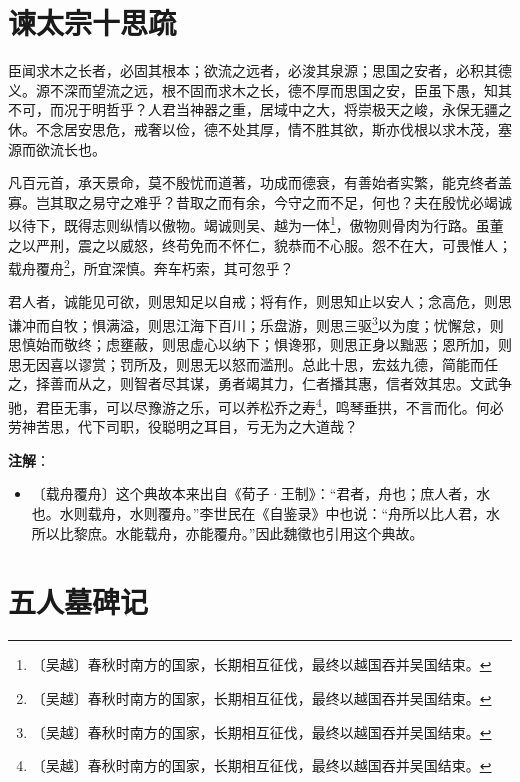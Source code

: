 \documentclass[12pt,UTF-8,openany]{ctexbook}
\begin{document}
\chapter{谏太宗十思疏}

\begin{normalsize}
    
    臣闻求木之长者，必固其根本；欲流之远者，必浚其泉源；思国之安者，必积其德义。源不深而望流之远，根不固而求木之长，德不厚而思国之安，臣虽下愚，知其不可，而况于明哲乎？人君当神器之重，居域中之大，将崇极天之峻，永保无疆之休。不念居安思危，戒奢以俭，德不处其厚，情不胜其欲，斯亦伐根以求木茂，塞源而欲流长也。
    
    凡百元首，承天景命，莫不殷忧而道著，功成而德衰，有善始者实繁，能克终者盖寡。岂其取之易守之难乎？昔取之而有余，今守之而不足，何也？夫在殷忧必竭诚以待下，既得志则纵情以傲物。竭诚则吴、越为一体\footnote{〔吴越〕春秋时南方的国家，长期相互征伐，最终以越国吞并吴国结束。}，傲物则骨肉为行路。虽董之以严刑，震之以威怒，终苟免而不怀仁，貌恭而不心服。怨不在大，可畏惟人；载舟覆舟\footnote{〔吴越〕春秋时南方的国家，长期相互征伐，最终以越国吞并吴国结束。}，所宜深慎。奔车朽索，其可忽乎？
    
    君人者，诚能见可欲，则思知足以自戒；将有作，则思知止以安人；念高危，则思谦冲而自牧；惧满溢，则思江海下百川；乐盘游，则思三驱\footnote{〔吴越〕春秋时南方的国家，长期相互征伐，最终以越国吞并吴国结束。}以为度；忧懈怠，则思慎始而敬终；虑壅蔽，则思虚心以纳下；惧谗邪，则思正身以黜恶；恩所加，则思无因喜以谬赏；罚所及，则思无以怒而滥刑。总此十思，宏兹九德，简能而任之，择善而从之，则智者尽其谋，勇者竭其力，仁者播其惠，信者效其忠。文武争驰，君臣无事，可以尽豫游之乐，可以养松乔之寿\footnote{〔吴越〕春秋时南方的国家，长期相互征伐，最终以越国吞并吴国结束。}，鸣琴垂拱，不言而化。何必劳神苦思，代下司职，役聪明之耳目，亏无为之大道哉？
\end{normalsize}


\newpage

\textbf{注解}：

\vspace{-1em}

\begin{itemize}
    \setlength\itemsep{-0.2em}
    \item〔载舟覆舟〕这个典故本来出自《荀子·王制》：“君者，舟也；庶人者，水也。水则载舟，水则覆舟。”李世民在《自鉴录》中也说：“舟所以比人君，水所以比黎庶。水能载舟，亦能覆舟。”因此魏徵也引用这个典故。
\end{itemize}

\chapter{五人墓碑记}
\end{document}
